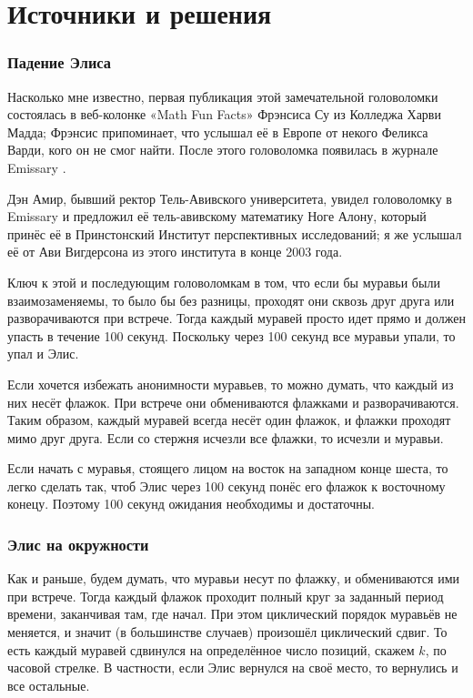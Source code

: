 \section*{Источники и решения}

\subsubsection*{Падение Элиса}

Насколько мне известно, первая публикация этой замечательной головоломки состоялась в веб-колонке «Math Fun Facts» Фрэнсиса Су из Колледжа Харви Мадда;
Фрэнсис припоминает, что услышал её в Европе от некого Феликса Варди, кого он не смог найти.
После этого головоломка появилась в журнале Emissary \cite[Весна/Осень 2003]{berlekamp-buhle}.

Дэн Амир, бывший ректор Тель-Авивского университета, увидел головоломку в Emissary и предложил её тель-авивскому математику Ноге Алону, который принёс её в Принстонский Институт перспективных исследований;
я же услышал её от Ави Вигдерсона из этого института в конце 2003 года.

Ключ к этой и последующим головоломкам в том, что если бы муравьи были взаимозаменяемы, то было бы без разницы, проходят они сквозь друг друга или разворачиваются при встрече.
Тогда каждый муравей просто идет прямо и должен упасть в течение 100 секунд.
Поскольку через 100 секунд все муравьи упали, то упал и Элис.

Если хочется избежать анонимности муравьев, то можно думать, что каждый из них несёт флажок.
При встрече они обмениваются флажками и разворачиваются.
Таким образом, каждый муравей всегда несёт один флажок, и флажки проходят мимо друг друга.
Если со стержня исчезли все флажки, то исчезли и муравьи.

Если начать с муравья, стоящего лицом на восток на западном конце шеста, то легко сделать так, чтоб Элис через 100 секунд понёс его флажок к восточному конецу.
Поэтому 100 секунд ожидания необходимы и достаточны.

\subsubsection*{Элис на окружности}

Как и раньше, будем думать, что муравьи несут по флажку, и обмениваются ими при встрече.
Тогда каждый флажок проходит полный круг за заданный период времени, заканчивая там, где начал.
При этом циклический порядок муравьёв не меняется, и значит (в большинстве случаев) произошёл циклический сдвиг.
То есть каждый муравей сдвинулся на определённое число позиций, скажем $k$, по часовой стрелке.
В частности, если Элис вернулся на своё место, то вернулись и все остальные.

